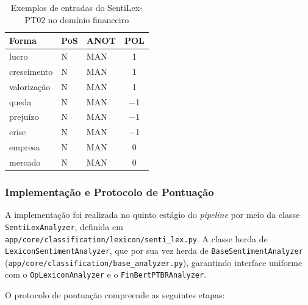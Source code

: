 \begin{table}[!htbp]
	\caption{Exemplos de entradas do SentiLex-PT02 no domínio financeiro}
	\label{tab:sentilex_exemplos}
	\centering
	\begin{tabular}{lllc}
		\hline
		\textbf{Forma} & \textbf{PoS} & \textbf{ANOT} & \textbf{POL} \\
		\hline
		lucro      & N   & MAN & \phantom{$-$}1 \\
		\hline
		crescimento & N  & MAN & \phantom{$-$}1 \\
		\hline
		valorização & N  & MAN & \phantom{$-$}1 \\
		\hline
		queda      & N   & MAN & $-$1 \\
		\hline
		prejuízo   & N   & MAN & $-$1 \\
		\hline
		crise      & N   & MAN & $-$1 \\
		\hline
		empresa    & N   & MAN & \phantom{$-$}0 \\
		\hline
		mercado    & N   & MAN & \phantom{$-$}0 \\
		\hline
	\end{tabular}
\end{table}

\subsubsection{Implementação e Protocolo de Pontuação}
\label{subsubsec:protocolo_sentilex}

A implementação foi realizada no quinto estágio do \textit{pipeline} por meio da classe \texttt{SentiLexAnalyzer}, definida em \texttt{app/core/classification/lexicon/senti\_lex.py}. A classe herda de \texttt{LexiconSentimentAnalyzer}, que por sua vez herda de \texttt{BaseSentimentAnalyzer} (\texttt{app/core/classification/base\_analyzer.py}), garantindo interface uniforme com o \texttt{OpLexiconAnalyzer} e o \texttt{FinBertPTBRAnalyzer}.

O protocolo de pontuação compreende as seguintes etapas:


